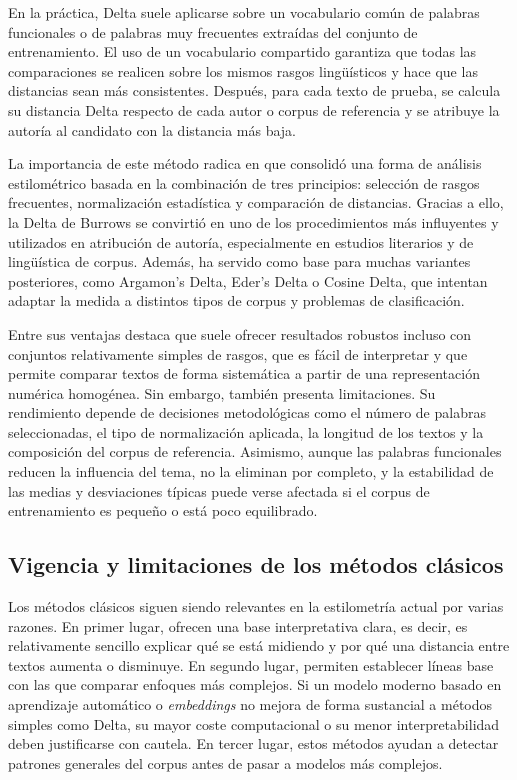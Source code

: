 \documentclass[IB]{TFUOC}%
\begin{document}
En la práctica, Delta suele aplicarse sobre un vocabulario común de palabras funcionales o de palabras muy frecuentes extraídas del conjunto de entrenamiento. El uso de un vocabulario compartido garantiza que todas las comparaciones se realicen sobre los mismos rasgos lingüísticos y hace que las distancias sean más consistentes. Después, para cada texto de prueba, se calcula su distancia Delta respecto de cada autor o corpus de referencia y se atribuye la autoría al candidato con la distancia más baja.

La importancia de este método radica en que consolidó una forma de análisis estilométrico basada en la combinación de tres principios: selección de rasgos frecuentes, normalización estadística y comparación de distancias. Gracias a ello, la Delta de Burrows se convirtió en uno de los procedimientos más influyentes y utilizados en atribución de autoría, especialmente en estudios literarios y de lingüística de corpus. Además, ha servido como base para muchas variantes posteriores, como Argamon's Delta, Eder's Delta o Cosine Delta, que intentan adaptar la medida a distintos tipos de corpus y problemas de clasificación\cite{eder2015does}.

Entre sus ventajas destaca que suele ofrecer resultados robustos incluso con conjuntos relativamente simples de rasgos, que es fácil de interpretar y que permite comparar textos de forma sistemática a partir de una representación numérica homogénea. Sin embargo, también presenta limitaciones. Su rendimiento depende de decisiones metodológicas como el número de palabras seleccionadas, el tipo de normalización aplicada, la longitud de los textos y la composición del corpus de referencia. Asimismo, aunque las palabras funcionales reducen la influencia del tema, no la eliminan por completo, y la estabilidad de las medias y desviaciones típicas puede verse afectada si el corpus de entrenamiento es pequeño o está poco equilibrado.

\subsection{Vigencia y limitaciones de los métodos clásicos}

Los métodos clásicos siguen siendo relevantes en la estilometría actual por varias razones. En primer lugar, ofrecen una base interpretativa clara, es decir, es relativamente sencillo explicar qué se está midiendo y por qué una distancia entre textos aumenta o disminuye. En segundo lugar, permiten establecer líneas base con las que comparar enfoques más complejos. Si un modelo moderno basado en aprendizaje automático o \textit{embeddings} no mejora de forma sustancial a métodos simples como Delta, su mayor coste computacional o su menor interpretabilidad deben justificarse con cautela. En tercer lugar, estos métodos ayudan a detectar patrones generales del corpus antes de pasar a modelos más complejos.
\end{document}
